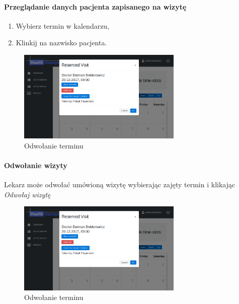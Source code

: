 \documentclass[polish,12pt]{aghthesis}
\begin{document}
     \paragraph{Przeglądanie danych pacjenta zapisanego na wizytę}{
        \begin{enumerate}
          \item Wybierz termin w kalendarzu,
          \item Klinkij na nazwisko pacjenta.
        \end{enumerate}
        \begin{figure}[H]
        \includegraphics[width=0.7\textwidth]{gui-doc-enrolled}
        \caption{Odwołanie terminu}
        \end{figure}  
    }
     \paragraph{Odwołanie wizyty}{
     Lekarz może odwołać umówioną wizytę wybierając zajęty termin i klikając \emph{Odwołaj wizytę}
        \begin{figure}[H]
        \includegraphics[width=0.7\textwidth]{gui-doc-enrolled}
        \caption{Odwołanie terminu}
        \end{figure}  
    }
\end{document}
